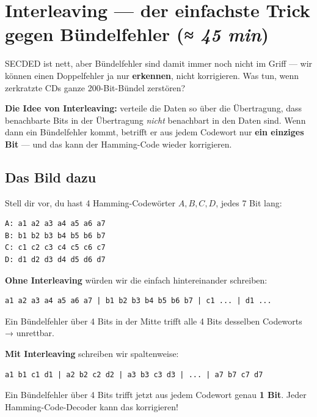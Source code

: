 \section{Interleaving — der einfachste Trick gegen Bündelfehler \normalfont(\textit{≈ 45 min})}

SECDED ist nett, aber Bündelfehler sind damit immer noch nicht im
Griff — wir können einen Doppelfehler ja nur \textbf{erkennen}, nicht
korrigieren. Was tun, wenn zerkratzte CDs ganze 200-Bit-Bündel
zerstören?

\textbf{Die Idee von Interleaving:} verteile die Daten so über die
Übertragung, dass benachbarte Bits in der Übertragung \emph{nicht}
benachbart in den Daten sind. Wenn dann ein Bündelfehler kommt,
betrifft er aus jedem Codewort nur \textbf{ein einziges Bit} — und
das kann der Hamming-Code wieder korrigieren.

\subsection*{Das Bild dazu}

Stell dir vor, du hast 4 Hamming-Codewörter $A, B, C, D$, jedes 7 Bit
lang:

\begin{verbatim}
A: a1 a2 a3 a4 a5 a6 a7
B: b1 b2 b3 b4 b5 b6 b7
C: c1 c2 c3 c4 c5 c6 c7
D: d1 d2 d3 d4 d5 d6 d7
\end{verbatim}

\textbf{Ohne Interleaving} würden wir die einfach hintereinander
schreiben:

\begin{verbatim}
a1 a2 a3 a4 a5 a6 a7 | b1 b2 b3 b4 b5 b6 b7 | c1 ... | d1 ...
\end{verbatim}

Ein Bündelfehler über 4 Bits in der Mitte trifft alle 4 Bits desselben
Codeworts → unrettbar.

\textbf{Mit Interleaving} schreiben wir spaltenweise:

\begin{verbatim}
a1 b1 c1 d1 | a2 b2 c2 d2 | a3 b3 c3 d3 | ... | a7 b7 c7 d7
\end{verbatim}

Ein Bündelfehler über 4 Bits trifft jetzt aus jedem Codewort genau
\textbf{1 Bit}. Jeder Hamming-Code-Decoder kann das korrigieren!

